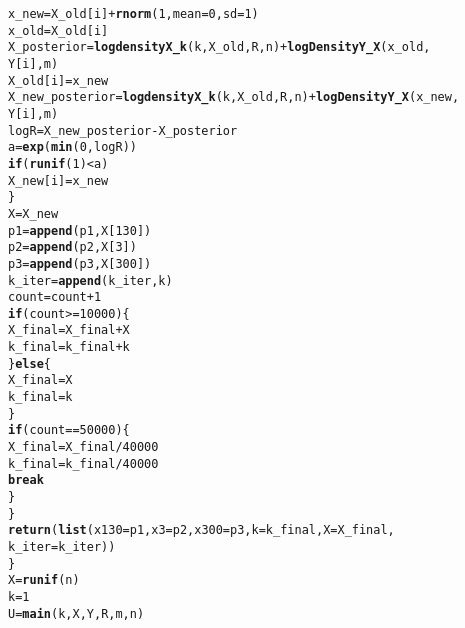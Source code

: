 \documentclass[12pt]{article}\usepackage[]{graphicx}\usepackage[]{color}
\makeatletter
\newcommand{\hlnum}[1]{\textcolor[rgb]{0.686,0.059,0.569}{#1}}%
\newcommand{\hlopt}[1]{\textcolor[rgb]{0,0,0}{#1}}%
\newcommand{\hlstd}[1]{\textcolor[rgb]{0.345,0.345,0.345}{#1}}%
\newcommand{\hlkwa}[1]{\textcolor[rgb]{0.161,0.373,0.58}{\textbf{#1}}}%
\newcommand{\hlkwb}[1]{\textcolor[rgb]{0.69,0.353,0.396}{#1}}%
\newcommand{\hlkwc}[1]{\textcolor[rgb]{0.333,0.667,0.333}{#1}}%
\newcommand{\hlkwd}[1]{\textcolor[rgb]{0.737,0.353,0.396}{\textbf{#1}}}%
\newenvironment{kframe}{%
 \def\at@end@of@kframe{}%
 \ifinner\ifhmode%
  \def\at@end@of@kframe{\end{minipage}}%
  \begin{minipage}{\columnwidth}%
 \fi\fi%
 \def\FrameCommand##1{\hskip\@totalleftmargin \hskip-\fboxsep
 \colorbox{shadecolor}{##1}\hskip-\fboxsep
     \hskip-\linewidth \hskip-\@totalleftmargin \hskip\columnwidth}%
 \MakeFramed {\advance\hsize-\width
   \@totalleftmargin\z@ \linewidth\hsize
   \@setminipage}}%
 {\par\unskip\endMakeFramed%
 \at@end@of@kframe}
\newenvironment{knitrout}{}{} %
\makeatother
\begin{document}
\begin{knitrout}
\begin{kframe}
\begin{alltt}
            \hlstd{x_new} \hlkwb{=} \hlstd{X_old[i]} \hlopt{+} \hlkwd{rnorm}\hlstd{(}\hlnum{1}\hlstd{,} \hlkwc{mean} \hlstd{=} \hlnum{0}\hlstd{,} \hlkwc{sd} \hlstd{=} \hlnum{1}\hlstd{)}
            \hlstd{x_old} \hlkwb{=} \hlstd{X_old[i]}
            \hlstd{X_posterior} \hlkwb{=} \hlkwd{logdensityX_k}\hlstd{(k, X_old, R, n)} \hlopt{+} \hlkwd{logDensityY_X}\hlstd{(x_old,}
                \hlstd{Y[i], m)}
            \hlstd{X_old[i]} \hlkwb{=} \hlstd{x_new}
            \hlstd{X_new_posterior} \hlkwb{=} \hlkwd{logdensityX_k}\hlstd{(k, X_old, R, n)} \hlopt{+} \hlkwd{logDensityY_X}\hlstd{(x_new,}
                \hlstd{Y[i], m)}
            \hlstd{logR} \hlkwb{=} \hlstd{X_new_posterior} \hlopt{-} \hlstd{X_posterior}
            \hlstd{a} \hlkwb{=} \hlkwd{exp}\hlstd{(}\hlkwd{min}\hlstd{(}\hlnum{0}\hlstd{, logR))}
            \hlkwa{if} \hlstd{(}\hlkwd{runif}\hlstd{(}\hlnum{1}\hlstd{)} \hlopt{<} \hlstd{a)}
                \hlstd{X_new[i]} \hlkwb{=} \hlstd{x_new}
        \hlstd{\}}
        \hlstd{X} \hlkwb{=} \hlstd{X_new}
        \hlstd{p1} \hlkwb{=} \hlkwd{append}\hlstd{(p1, X[}\hlnum{130}\hlstd{])}
        \hlstd{p2} \hlkwb{=} \hlkwd{append}\hlstd{(p2, X[}\hlnum{3}\hlstd{])}
        \hlstd{p3} \hlkwb{=} \hlkwd{append}\hlstd{(p3, X[}\hlnum{300}\hlstd{])}
        \hlstd{k_iter} \hlkwb{=} \hlkwd{append}\hlstd{(k_iter, k)}
        \hlstd{count} \hlkwb{=} \hlstd{count} \hlopt{+} \hlnum{1}
        \hlkwa{if} \hlstd{(count} \hlopt{>=} \hlnum{10000}\hlstd{) \{}
            \hlstd{X_final} \hlkwb{=} \hlstd{X_final} \hlopt{+} \hlstd{X}
            \hlstd{k_final} \hlkwb{=} \hlstd{k_final} \hlopt{+} \hlstd{k}
        \hlstd{\}} \hlkwa{else} \hlstd{\{}
            \hlstd{X_final} \hlkwb{=} \hlstd{X}
            \hlstd{k_final} \hlkwb{=} \hlstd{k}
        \hlstd{\}}
        \hlkwa{if} \hlstd{(count} \hlopt{==} \hlnum{50000}\hlstd{) \{}
            \hlstd{X_final} \hlkwb{=} \hlstd{X_final}\hlopt{/}\hlnum{40000}
            \hlstd{k_final} \hlkwb{=} \hlstd{k_final}\hlopt{/}\hlnum{40000}
            \hlkwa{break}
        \hlstd{\}}
    \hlstd{\}}
    \hlkwd{return}\hlstd{(}\hlkwd{list}\hlstd{(}\hlkwc{x130} \hlstd{= p1,} \hlkwc{x3} \hlstd{= p2,} \hlkwc{x300} \hlstd{= p3,} \hlkwc{k} \hlstd{= k_final,} \hlkwc{X} \hlstd{= X_final,}
        \hlkwc{k_iter} \hlstd{= k_iter))}
\hlstd{\}}
\hlstd{X} \hlkwb{=} \hlkwd{runif}\hlstd{(n)}
\hlstd{k} \hlkwb{=} \hlnum{1}
\hlstd{U} \hlkwb{=} \hlkwd{main}\hlstd{(k, X, Y, R, m, n)}
\end{alltt}
\end{kframe}
\end{knitrout}
\end{document}
